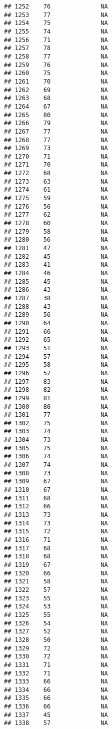 \documentclass[]{article}
\begin{document}
\begin{verbatim}
## 1252    76              NA
## 1253    77              NA
## 1254    75              NA
## 1255    74              NA
## 1256    71              NA
## 1257    78              NA
## 1258    77              NA
## 1259    76              NA
## 1260    75              NA
## 1261    70              NA
## 1262    69              NA
## 1263    68              NA
## 1264    67              NA
## 1265    80              NA
## 1266    79              NA
## 1267    77              NA
## 1268    77              NA
## 1269    73              NA
## 1270    71              NA
## 1271    70              NA
## 1272    68              NA
## 1273    63              NA
## 1274    61              NA
## 1275    59              NA
## 1276    56              NA
## 1277    62              NA
## 1278    60              NA
## 1279    58              NA
## 1280    56              NA
## 1281    47              NA
## 1282    45              NA
## 1283    41              NA
## 1284    46              NA
## 1285    45              NA
## 1286    43              NA
## 1287    38              NA
## 1288    43              NA
## 1289    56              NA
## 1290    64              NA
## 1291    66              NA
## 1292    65              NA
## 1293    51              NA
## 1294    57              NA
## 1295    58              NA
## 1296    57              NA
## 1297    83              NA
## 1298    82              NA
## 1299    81              NA
## 1300    80              NA
## 1301    77              NA
## 1302    75              NA
## 1303    74              NA
## 1304    73              NA
## 1305    75              NA
## 1306    74              NA
## 1307    74              NA
## 1308    73              NA
## 1309    67              NA
## 1310    67              NA
## 1311    68              NA
## 1312    66              NA
## 1313    73              NA
## 1314    73              NA
## 1315    72              NA
## 1316    71              NA
## 1317    68              NA
## 1318    68              NA
## 1319    67              NA
## 1320    66              NA
## 1321    58              NA
## 1322    57              NA
## 1323    55              NA
## 1324    53              NA
## 1325    55              NA
## 1326    54              NA
## 1327    52              NA
## 1328    50              NA
## 1329    72              NA
## 1330    72              NA
## 1331    71              NA
## 1332    71              NA
## 1333    66              NA
## 1334    66              NA
## 1335    66              NA
## 1336    66              NA
## 1337    45              NA
## 1338    57              NA

\end{verbatim}
\end{document}
